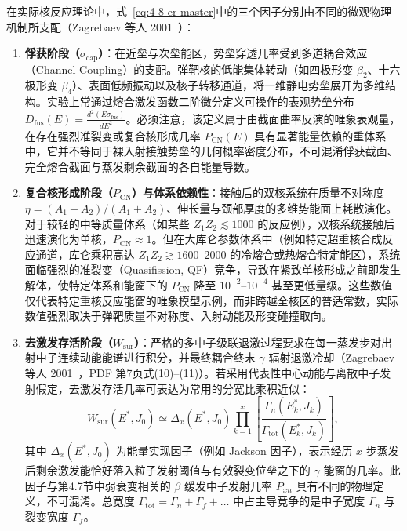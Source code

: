 在实际核反应理论中，式~\eqref{eq:4-8-er-master}中的三个因子分别由不同的微观物理机制所支配（Zagrebaev 等人 2001~\cite{zagrebaev-2001-superheavy-synthesis-survival}）：
\begin{enumerate}
\item \textbf{俘获阶段（$\sigma_{\mathrm{cap}}$）}：在近垒与次垒能区，势垒穿透几率受到多道耦合效应（Channel Coupling）的支配。弹靶核的低能集体转动（如四极形变 $\beta_2$、十六极形变 $\beta_4$）、表面低频振动以及核子转移通道，将一维静电势垒展开为多维结构。实验上常通过熔合激发函数二阶微分定义可操作的表观势垒分布 $D_{\mathrm{fus}}(E) = \frac{d^2(E \sigma_{\mathrm{fus}})}{dE^2}$。必须注意，该定义属于由截面曲率反演的唯象表观量，在存在强烈准裂变或复合核形成几率 $P_{\mathrm{CN}}(E)$ 具有显著能量依赖的重体系中，它并不等同于裸入射接触势垒的几何概率密度分布，不可混淆俘获截面、完全熔合截面与蒸发剩余截面的各自能量导数。
\item \textbf{复合核形成阶段（$P_{\mathrm{CN}}$）与体系依赖性}：接触后的双核系统在质量不对称度 $\eta = (A_1 - A_2)/(A_1 + A_2)$、伸长量与颈部厚度的多维势能面上耗散演化。对于较轻的中等质量体系（如某些 $Z_1 Z_2 \lesssim 1000$ 的反应例），双核系统接触后迅速演化为单核，$P_{\mathrm{CN}} \approx 1$。但在大库仑参数体系中（例如特定超重核合成反应通道，库仑乘积高达 $Z_1 Z_2 \gtrsim 1600$--$2000$ 的冷熔合或热熔合特定能区），系统面临强烈的准裂变（Quasifission, QF）竞争，导致在紧致单核形成之前即发生解体，使特定体系和能窗下的 $P_{\mathrm{CN}}$ 降至 $10^{-2}$--$10^{-4}$ 甚至更低量级。这些数值仅代表特定重核反应能窗的唯象模型示例，而非跨越全核区的普适常数，实际数值强烈取决于弹靶质量不对称度、入射动能及形变碰撞取向。
\item \textbf{去激发存活阶段（$W_{\mathrm{sur}}$）}：严格的多中子级联退激过程要求在每一蒸发步对出射中子连续动能能谱进行积分，并最终耦合终末 $\gamma$ 辐射退激冷却（Zagrebaev 等人 2001~\cite{zagrebaev-2001-superheavy-synthesis-survival}，PDF 第7页式(10)--(11)）。若采用代表性中心动能与离散中子发射假定，去激发存活几率可表达为常用的分宽比乘积近似：
\begin{equation}\label{eq:4-8-wsur-product}
W_{\mathrm{sur}}(E^*, J_0) \simeq \Delta_x(E^*, J_0) \prod_{k=1}^x \left[ \frac{\Gamma_n(E_k^*, J_k)}{\Gamma_{\mathrm{tot}}(E_k^*, J_k)} \right],
\end{equation}
其中 $\Delta_x(E^*, J_0)$ 为能量实现因子（例如 Jackson 因子），表示经历 $x$ 步蒸发后剩余激发能恰好落入粒子发射阈值与有效裂变位垒之下的 $\gamma$ 能窗的几率。此因子与第4.7节中弱衰变相关的 $\beta$ 缓发中子发射几率 $P_{xn}$ 具有不同的物理定义，不可混淆。总宽度 $\Gamma_{\mathrm{tot}} = \Gamma_n + \Gamma_f + \dots$ 中占主导竞争的是中子宽度 $\Gamma_n$ 与裂变宽度 $\Gamma_f$。


\end{enumerate}
